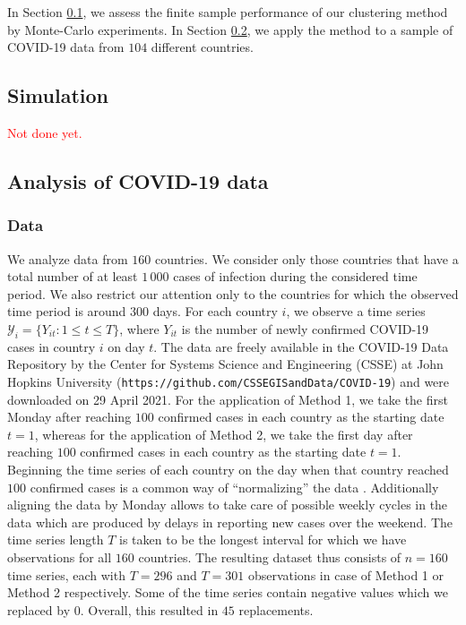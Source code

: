 \documentclass[a4paper,12pt]{article}
\numberwithin{equation}{section}
\begin{document}
In Section \ref{subsec:sim}, we assess the finite sample performance of our clustering method by Monte-Carlo experiments. In Section \ref{subsec:app}, we apply the method to a sample of COVID-19 data from $104$ different countries. 



\subsection{Simulation}\label{subsec:sim}


\textcolor{red}{Not done yet.} 


\subsection{Analysis of COVID-19 data}\label{subsec:app}


\subsubsection{Data}


We analyze data from $160$ countries. We consider only those countries that have a total number of at least $1\,000$ cases of infection during the considered time period. We also restrict our attention only to the countries for which the observed time period is around $300$ days. For each country $i$, we observe a time series $\mathcal{Y}_i = \{ Y_{it}: 1 \le t \le T \}$, where $Y_{it}$ is the number of newly confirmed COVID-19 cases in country $i$ on day $t$. The data are freely available in the COVID-19 Data Repository by the Center for Systems Science and Engineering (CSSE) at John Hopkins University (\texttt{https://github.com/CSSEGISandData/COVID-19}) and were downloaded on 29 April 2021. For the application of Method 1, we take the first Monday after reaching $100$ confirmed cases in each country as the starting date $t=1$, whereas for the application of Method 2, we take the first day after reaching $100$ confirmed cases in each country as the starting date $t=1$.
Beginning the time series of each country on the day when that country reached $100$ confirmed cases is a common way of ``normalizing'' the data \citep[see e.g.][]{Cohen2020}. Additionally aligning the data by Monday allows to take care of possible weekly cycles in the data which are produced by delays in reporting new cases over the weekend. 
The time series length $T$ is taken to be the longest interval for which we have observations for all $160$ countries. The resulting dataset thus consists of $n = 160$ time series, each with $T = 296$ and $T = 301$ observations in case of Method 1 or Method 2 respectively. Some of the time series contain negative values which we replaced by $0$. Overall, this resulted in $45$ replacements.
\end{document}
